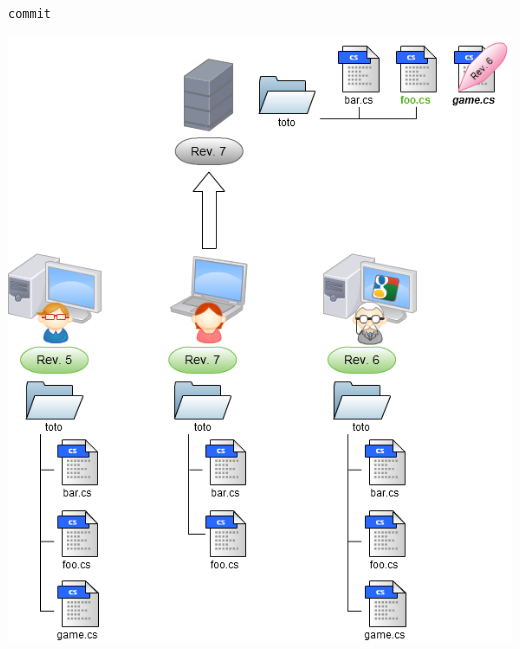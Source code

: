 \begin{frame}
  \texttt{commit}
  \begin{center}
    \vspace{-12pt}
    \includegraphics[scale=0.3]{images/10-Commit4.png}
  \end{center}
\end{frame}

